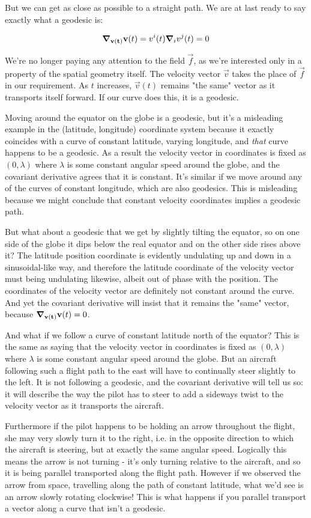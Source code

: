 But we can get as close as possible to a straight path. We are at last ready to say exactly what a geodesic is:

$$
\grad_{\mathbf{v(t)}} \mathbf{v}(t)
=
v^i(t) \grad_i v^j(t) = 0
$$

We're no longer paying any attention to the field $\vec{f}$, as we're interested only in a property of the spatial geometry itself. The velocity vector $\vec{v}$ takes the place of $\vec{f}$ in our requirement. As $t$ increases, $\vec{v}(t)$ remains "the same" vector as it transports itself forward. If our curve does this, it is a geodesic.

Moving around the equator on the globe is a geodesic, but it's a misleading example in the (latitude, longitude) coordinate system because it exactly coincides with a curve of constant latitude, varying longitude, and \textit{that} curve happens to be a geodesic. As a result the velocity vector in coordinates is fixed as $(0, \lambda)$ where $\lambda$ is some constant angular speed around the globe, and the covariant derivative agrees that it is constant. It's similar if we move around any of the curves of constant longitude, which are also geodesics. This is misleading because we might conclude that constant velocity coordinates implies a geodesic path.

But what about a geodesic that we get by slightly tilting the equator, so on one side of the globe it dips below the real equator and on the other side rises above it? The latitude position coordinate is evidently undulating up and down in a sinusoidal-like way, and therefore the latitude coordinate of the velocity vector must being undulating likewise, albeit out of phase with the position. The coordinates of the velocity vector are definitely not constant around the curve. And yet the covariant derivative will insist that it remains the "same" vector, because $\grad_{\mathbf{v(t)}} \mathbf{v}(t) = 0$.

And what if we follow a curve of constant latitude north of the equator? This is the same as saying that the velocity vector in coordinates is fixed as $(0, \lambda)$ where $\lambda$ is some constant angular speed around the globe. But an aircraft following such a flight path to the east will have to continually steer slightly to the left. It is not following a geodesic, and the covariant derivative will tell us so: it will describe the way the pilot has to steer to add a sideways twist to the velocity vector as it transports the aircraft.

Furthermore if the pilot happens to be holding an arrow throughout the flight, she may very slowly turn it to the right, i.e. in the opposite direction to which the aircraft is steering, but at exactly the same angular speed. Logically this means the arrow is not turning - it's only turning relative to the aircraft, and so it is being parallel transported along the flight path. However if we observed the arrow from space, travelling along the path of constant latitude, what we'd see is an arrow slowly rotating clockwise! This is what happens if you parallel transport a vector along a curve that isn't a geodesic.


